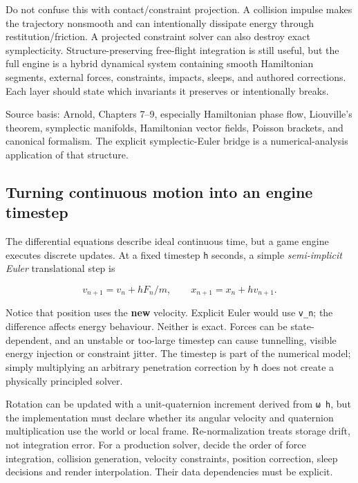 Do not confuse this with contact/constraint projection. A collision impulse makes the trajectory nonsmooth and can intentionally dissipate energy through restitution/friction. A projected constraint solver can also destroy exact symplecticity. Structure-preserving free-flight integration is still useful, but the full engine is a hybrid dynamical system containing smooth Hamiltonian segments, external forces, constraints, impacts, sleeps, and authored corrections. Each layer should state which invariants it preserves or intentionally breaks.

Source basis: Arnold, Chapters 7--9, especially Hamiltonian phase flow, Liouville's theorem, symplectic manifolds, Hamiltonian vector fields, Poisson brackets, and canonical formalism. The explicit symplectic-Euler bridge is a numerical-analysis application of that structure.

\subsection{Turning continuous motion into an engine timestep}\label{06-engine-ii-ch033-turning-continuous-motion-into-an-engine-timestep}

The differential equations describe ideal continuous time, but a game engine executes discrete updates. At a fixed timestep \texttt{h} seconds, a simple \emph{semi-implicit Euler} translational step is

\[
v_{n+1}=v_n+h F_n/m,\qquad x_{n+1}=x_n+h v_{n+1}.
\]

Notice that position uses the \textbf{new} velocity. Explicit Euler would use \texttt{v\_n}; the difference affects energy behaviour. Neither is exact. Forces can be state-dependent, and an unstable or too-large timestep can cause tunnelling, visible energy injection or constraint jitter. The timestep is part of the numerical model; simply multiplying an arbitrary penetration correction by \texttt{h} does not create a physically principled solver.

Rotation can be updated with a unit-quaternion increment derived from \texttt{ω\ h}, but the implementation must declare whether its angular velocity and quaternion multiplication use the world or local frame. Re-normalization treats storage drift, not integration error. For a production solver, decide the order of force integration, collision generation, velocity constraints, position correction, sleep decisions and render interpolation. Their data dependencies must be explicit.

